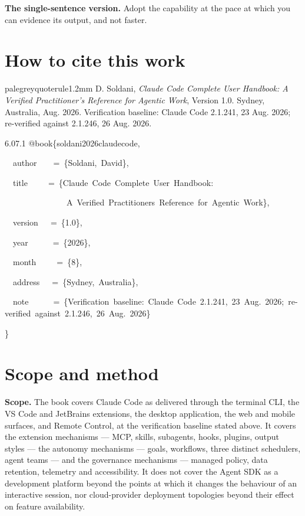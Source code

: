 \documentclass[11pt,a4paper,twoside,openany]{book}
\newcommand{\cl}[1]{\noindent\mbox{#1}\par}
\begin{document}
\textbf{The single-sentence version.} Adopt the capability at the pace at which you can evidence its output, and not faster.


\FloatBarrier
\section*{How to cite this work}

\begin{calloutbox}{palegrey}{quoterule}{1.2mm}
D. Soldani, \emph{Claude Code Complete User Handbook: A Verified Practitioner's Reference for Agentic Work}, Version 1.0. Sydney, Australia, Aug. 2026. Verification baseline: Claude Code 2.1.241, 23 Aug. 2026; re-verified against 2.1.246, 26 Aug. 2026.
\end{calloutbox}

\begin{codeblock}{6.0}{7.1}
\cl{@book\{soldani2026claudecode,}
\cl{~~author~~~~=~\{Soldani,~David\},}
\cl{~~title~~~~~=~\{Claude~Code~Complete~User~Handbook:}
\cl{~~~~~~~~~~~~~~~A~Verified~Practitioner\textquotesingle{}s~Reference~for~Agentic~Work\},}
\cl{~~version~~~=~\{1.0\},}
\cl{~~year~~~~~~=~\{2026\},}
\cl{~~month~~~~~=~\{8\},}
\cl{~~address~~~=~\{Sydney,~Australia\},}
\cl{~~note~~~~~~=~\{Verification~baseline:~Claude~Code~2.1.241,~23~Aug.~2026;~re-verified~against~2.1.246,~26~Aug.~2026\}}
\cl{\}}
\end{codeblock}

\FloatBarrier
\section*{Scope and method}

\textbf{Scope.} The book covers Claude Code as delivered through the terminal CLI, the VS Code and JetBrains extensions, the desktop application, the web and mobile surfaces, and Remote Control, at the verification baseline stated above. It covers the extension mechanisms — MCP, skills, subagents, hooks, plugins, output styles — the autonomy mechanisms — goals, workflows, three distinct schedulers, agent teams — and the governance mechanisms — managed policy, data retention, telemetry and accessibility. It does not cover the Agent SDK as a development platform beyond the points at which it changes the behaviour of an interactive session, nor cloud-provider deployment topologies beyond their effect on feature availability.
\end{document}
